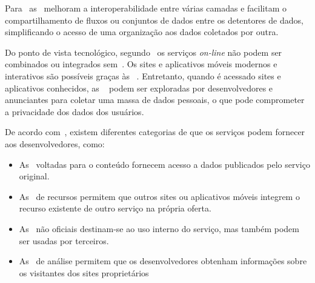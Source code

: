 Para~\textcite{borgogno2019} as~ melhoram a
interoperabilidade entre várias camadas e facilitam o compartilhamento de
fluxos ou conjuntos de dados entre os detentores de dados, simplificando o
acesso de uma organização aos dados coletados por outra.

Do ponto de vista tecnológico, segundo~\textcite{russel2019} os serviços
\textit{on-line} não podem ser combinados ou integrados sem~.
Os sites e aplicativos móveis modernos e interativos são possíveis graças às
~.
Entretanto, quando é acessado sites e aplicativos conhecidos, as
~ podem ser exploradas por desenvolvedores e anunciantes para
coletar uma massa de dados pessoais, o que pode comprometer a privacidade dos
dados dos usuários.

De acordo com~\textcite{russel2019}, existem diferentes categorias de
 que os serviços podem fornecer aos desenvolvedores, como:

\begin{itemize}
    \item As~ voltadas para o conteúdo fornecem acesso a
    dados publicados pelo serviço original.
    \item As~ de recursos permitem que outros sites ou
    aplicativos móveis integrem o recurso existente de outro serviço na própria
    oferta.
    \item As~ não oficiais destinam-se ao uso interno do
    serviço, mas também podem ser usadas por terceiros.
    \item As~ de análise permitem que os desenvolvedores
    obtenham informações sobre os visitantes dos sites proprietários
\end{itemize}

